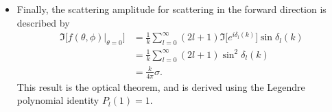 \documentclass[11pt, a4paper]{article}
\begin{document}
\begin{itemize}
    \item Finally, the scattering amplitude for scattering in the forward direction is described by
    \begin{align*}
        \Im \big[ f(\theta, \phi)\big |_{\theta = 0} \big] &= \frac{1}{k} \sum_{l = 0}^{\infty} (2l + 1) \Im \big[ e^{i\delta_{l}(k)} \big] \sin \delta_{l}(k) \\
        & = \frac{1}{k} \sum_{l = 0}^{\infty} (2l + 1) \sin^{2} \delta_{l}(k)\\
        &= \frac{k}{4\pi} \sigma.
    \end{align*}
    This result is the optical theorem, and is derived using the Legendre polynomial identity $ P_{l}(1) = 1 $.
    
\end{itemize}
\end{document}
